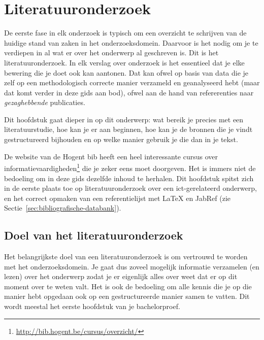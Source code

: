 \chapter{Literatuuronderzoek}
\label{ch:literatuuronderzoek}

De eerste fase in elk onderzoek is typisch om een overzicht te schrijven van de huidige stand van zaken in het onderzoeksdomein. Daarvoor is het nodig om je te verdiepen in al wat er over het onderwerp al geschreven is. Dit is het literatuuronderzoek. In elk verslag over onderzoek is het essentieel dat je elke bewering die je doet ook kan aantonen. Dat kan ofwel op basis van data die je zelf op een methodologisch correcte manier verzameld en geanalyseerd hebt (maar dat komt verder in deze gids aan bod), ofwel aan de hand van refererenties naar \emph{gezaghebbende} publicaties.

Dit hoofdstuk gaat dieper in op dit onderwerp: wat bereik je precies met een literatuurstudie, hoe kan je er aan beginnen, hoe kan je de bronnen die je vindt gestructureerd bijhouden en op welke manier gebruik je die dan in je tekst.

De website van de Hogent bib heeft een heel interessante cursus over informatievaardigheden\footnote{\url{http://bib.hogent.be/cursus/overzicht/}} die je zeker eens moet doorgeven. Het is immers niet de bedoeling om in deze gids dezelfde inhoud te herhalen. Dit hoofdstuk spitst zich in de eerste plaats toe op literatuuronderzoek over een ict-gerelateerd onderwerp, en het correct opmaken van een referentielijst met {\LaTeX} en JabRef (zie Sectie~\ref{sec:bibliografische-databank}).


\section{Doel van het literatuuronderzoek}
\label{sec:doel-literatuuronderzoek}

Het belangrijkste doel van een literatuuronderzoek is om vertrouwd te worden met het onderzoeksdomein. Je gaat dus zoveel mogelijk informatie verzamelen (en lezen) over het onderwerp zodat je er eigenlijk alles over weet dat er op dit moment over te weten valt. Het is ook de bedoeling om alle kennis die je op die manier hebt opgedaan ook op een gestructureerde manier samen te vatten. Dit wordt meestal het eerste hoofdstuk van je bachelorproef.

